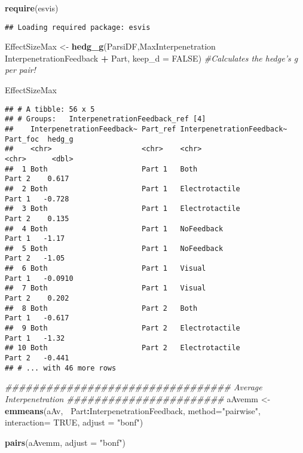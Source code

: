\documentclass[
]{article}
\newenvironment{Shaded}{\begin{snugshade}}{\end{snugshade}}
\newcommand{\CommentTok}[1]{\textcolor[rgb]{0.56,0.35,0.01}{\textit{#1}}}
\newcommand{\DataTypeTok}[1]{\textcolor[rgb]{0.13,0.29,0.53}{#1}}
\newcommand{\KeywordTok}[1]{\textcolor[rgb]{0.13,0.29,0.53}{\textbf{#1}}}
\newcommand{\NormalTok}[1]{#1}
\newcommand{\OperatorTok}[1]{\textcolor[rgb]{0.81,0.36,0.00}{\textbf{#1}}}
\newcommand{\OtherTok}[1]{\textcolor[rgb]{0.56,0.35,0.01}{#1}}
\newcommand{\StringTok}[1]{\textcolor[rgb]{0.31,0.60,0.02}{#1}}
\begin{document}
\begin{Shaded}
\begin{Highlighting}[]
\KeywordTok{require}\NormalTok{(esvis)}
\end{Highlighting}
\end{Shaded}

\begin{verbatim}
## Loading required package: esvis
\end{verbatim}

\begin{Shaded}
\begin{Highlighting}[]
\NormalTok{EffectSizeMax <-}\StringTok{ }\KeywordTok{hedg_g}\NormalTok{(ParsiDF,MaxInterpenetration }\OperatorTok{~}\StringTok{ }\NormalTok{InterpenetrationFeedback }\OperatorTok{+}\StringTok{ }\NormalTok{Part, }\DataTypeTok{keep_d =} \OtherTok{FALSE}\NormalTok{) }\CommentTok{#Calculates the hedge's g per pair! }

\NormalTok{EffectSizeMax}
\end{Highlighting}
\end{Shaded}

\begin{verbatim}
## # A tibble: 56 x 5
## # Groups:   InterpenetrationFeedback_ref [4]
##    InterpenetrationFeedback~ Part_ref InterpenetrationFeedback~ Part_foc  hedg_g
##    <chr>                     <chr>    <chr>                     <chr>      <dbl>
##  1 Both                      Part 1   Both                      Part 2    0.617 
##  2 Both                      Part 1   Electrotactile            Part 1   -0.728 
##  3 Both                      Part 1   Electrotactile            Part 2    0.135 
##  4 Both                      Part 1   NoFeedback                Part 1   -1.17  
##  5 Both                      Part 1   NoFeedback                Part 2   -1.05  
##  6 Both                      Part 1   Visual                    Part 1   -0.0910
##  7 Both                      Part 1   Visual                    Part 2    0.202 
##  8 Both                      Part 2   Both                      Part 1   -0.617 
##  9 Both                      Part 2   Electrotactile            Part 1   -1.32  
## 10 Both                      Part 2   Electrotactile            Part 2   -0.441 
## # ... with 46 more rows
\end{verbatim}

\begin{Shaded}
\begin{Highlighting}[]
\CommentTok{################################# Average Interpenetration #######################}
\NormalTok{aAvemm <-}\StringTok{ }\KeywordTok{emmeans}\NormalTok{(aAv,}\OperatorTok{~}\StringTok{ }\NormalTok{Part}\OperatorTok{:}\NormalTok{InterpenetrationFeedback,}
 \DataTypeTok{method=}\StringTok{"pairwise"}\NormalTok{, }\DataTypeTok{interaction=} \OtherTok{TRUE}\NormalTok{, }\DataTypeTok{adjust =} \StringTok{"bonf"}\NormalTok{)}

\KeywordTok{pairs}\NormalTok{(aAvemm, }\DataTypeTok{adjust =} \StringTok{"bonf"}\NormalTok{)}
\end{Highlighting}
\end{Shaded}
\end{document}

